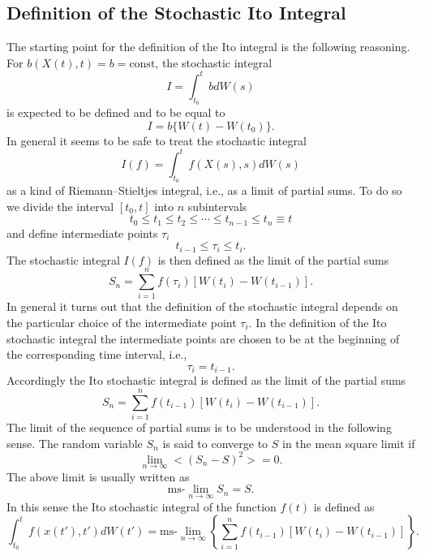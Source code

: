 \subsection{Definition of the Stochastic Ito Integral}
The starting point for the definition of the Ito integral is the
following reasoning. For $b(X(t),t)=b=\text{const}$, the stochastic 
integral
\begin{equation*}
I = \int_{t_0}^t bdW(s)
\end{equation*}
is expected to be defined and to be equal to
\begin{equation*}
I = b \{ W(t) - W(t_0) \}.
\end{equation*}
In general it seems to be safe to treat the stochastic 
integral 
\begin{equation*}
I(f) = \int_{t_0}^t f(X(s),s) dW(s)
\end{equation*}
as a kind of Riemann--Stieltjes integral, i.e., as a limit of 
partial sums. To do so we divide the interval $[t_0,t]$ into $n$
subintervals
\begin{equation*}
t_0 \le t_1 \le t_2 \le \cdots \le t_{n-1} \le t_n \equiv t
\end{equation*}
and define intermediate points $\tau_i$
\begin{equation*}
t_{i-1} \le \tau_i \le t_i.
\end{equation*}
The stochastic integral $I(f)$ is then defined as the limit
of the partial sums
\begin{equation*}
S_n = \sum_{i=1}^n f(\tau_i) \left[  W(t_i) - W(t_{i-1}) \right].
\end{equation*}
In general it turns out that the definition of the stochastic 
integral depends on the particular choice of the intermediate 
point $\tau_i$. In the definition of the Ito stochastic integral
the intermediate points are chosen to be at the beginning of
the corresponding time interval, i.e.,
\begin{equation*}
\tau_i = t_{i-1}.
\end{equation*}
Accordingly the Ito stochastic integral is defined as the limit of 
the partial sums
\begin{equation*}
S_n = \sum_{i=1}^n f(t_{i-1}) [  W(t_i) - W(t_{i-1}) ].
\end{equation*}
The limit of the sequence of partial sums is to be understood in the
following sense. The random variable $S_n$ is said to converge to $S$
 in the mean square limit if
\begin{equation*}
\lim_{n \rightarrow \infty}
 <(S_n -S)^2> =0.
\end{equation*}
The above limit is usually written as
\begin{equation*}
\text{ms-} \lim_{n \rightarrow \infty} S_n = S.
\end{equation*}
In this sense the Ito stochastic integral of the function $f(t)$ is
defined as
\begin{equation*}
\int_{t_0}^t f(x(t'),t') dW(t') = \text{ms-}\lim_{n \rightarrow \infty}
   \left\{ \sum_{i=1}^{n} f(t_{i-1}) [W(t_i) - W(t_{i-1})] 
   \right\}.
\end{equation*}

